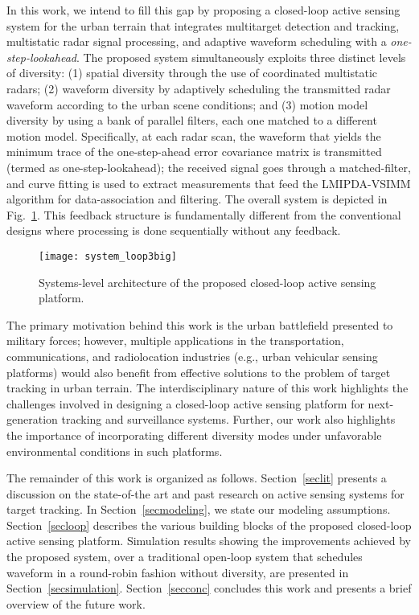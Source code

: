 \documentclass[times]{asjcauth}
\begin{document}
In this work, we intend to fill this gap by proposing a closed-loop active sensing system for the urban terrain that integrates multitarget detection and tracking, multistatic radar signal processing, and adaptive waveform scheduling with a \emph{one-step-lookahead}. The proposed system simultaneously exploits three distinct levels of diversity: (1) spatial diversity through the use of coordinated multistatic radars; (2) waveform diversity by adaptively scheduling the transmitted radar waveform according to the urban scene conditions; and (3) motion model diversity by using a bank of parallel filters, each one matched to a different motion model. Specifically, at each radar scan, the waveform that yields the minimum trace of the one-step-ahead error covariance matrix is transmitted (termed as one-step-lookahead); the received signal goes through a matched-filter, and curve fitting is used to extract measurements that feed the LMIPDA-VSIMM algorithm for data-association and filtering. The overall system is depicted in Fig.~\ref{figloop}. This feedback structure is fundamentally different from the conventional designs where processing is done sequentially without any feedback.
\begin{figure}[hbtp]
\begin{center}
\texttt{[image: system\_loop3big]}
\caption{Systems-level architecture of the proposed closed-loop active sensing platform.}\label{figloop}
\end{center}
\end{figure}

The primary motivation behind this work is the urban battlefield presented to military forces; however, multiple applications in the transportation, communications, and radiolocation industries (e.g., urban vehicular sensing platforms) would also benefit from effective solutions to the problem of target tracking in urban terrain. The interdisciplinary nature of this work highlights the challenges involved in designing a closed-loop active sensing platform for next-generation tracking and surveillance systems. Further, our work also highlights the importance of incorporating different diversity modes under unfavorable environmental conditions in such platforms.

The remainder of this work is organized as follows. Section~\ref{seclit} presents a discussion on the state-of-the art and past research on active sensing systems for target tracking. In Section~\ref{secmodeling}, we state our modeling assumptions. Section~\ref{secloop} describes the various building blocks of the proposed closed-loop active sensing platform. Simulation results showing the improvements achieved by the proposed system, over a traditional open-loop system that schedules waveform in a round-robin fashion without diversity, are presented in Section~\ref{secsimulation}. Section~\ref{secconc} concludes this work and presents a brief overview of the future work.
\end{document}
